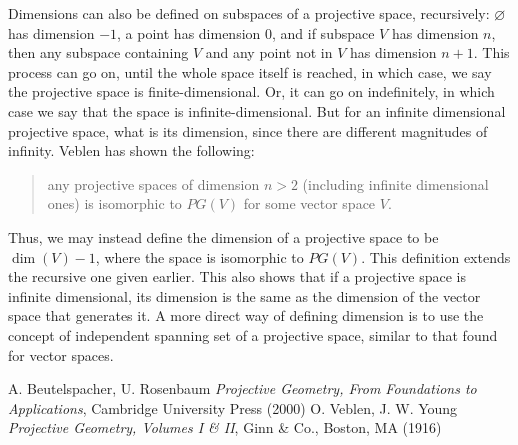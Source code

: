 \documentclass[12pt]{article}
\begin{document}
Dimensions can also be defined on subspaces of a projective space, recursively: $\varnothing$ has dimension $-1$, a point has dimension $0$, and if subspace $V$ has dimension $n$, then any subspace containing $V$ and any point not in $V$ has dimension $n+1$.  This process can go on, until the whole space itself is reached, in which case, we say the projective space is finite-dimensional.  Or, it can go on indefinitely, in which case we say that the space is infinite-dimensional.  But for an infinite dimensional projective space, what is its dimension, since there are different magnitudes of infinity.  Veblen has shown the following: 
\begin{quote}
any projective spaces of dimension $n>2$ (including infinite dimensional ones) is isomorphic to $PG(V)$ for some vector space $V$.
\end{quote}
Thus, we may instead define the dimension of a projective space to be $\operatorname{dim}(V)-1$, where the space is isomorphic to $PG(V)$.  This definition extends the recursive one given earlier.  This also shows that if a projective space is infinite dimensional, its dimension is the same as the dimension of the vector space that generates it.  A more direct way of defining dimension is to use the concept of independent spanning set of a projective space, similar to that found for vector spaces.

\begin{thebibliography}{6}
 A. Beutelspacher, U. Rosenbaum {\it Projective Geometry, From Foundations to Applications}, Cambridge University Press (2000)
 O. Veblen, J. W. Young {\it Projective Geometry, Volumes I \& II}, Ginn \& Co., Boston, MA (1916)
\end{thebibliography}
\end{document}
